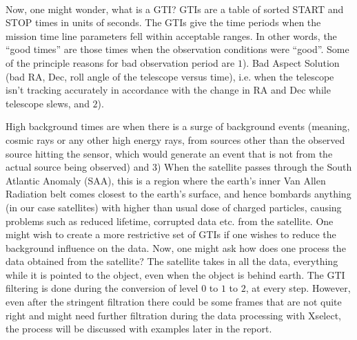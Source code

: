 \documentclass[a4paper,twoside]{report}
\numberwithin{equation}{section}
\begin{document}
\paragraph{}
Now, one might wonder, what is a GTI? GTIs are a table of sorted START and STOP times in units of seconds. The GTIs give the time periods when the mission time line parameters fell within acceptable ranges. In other words, the “good times” are those times when the observation conditions were “good”. Some of the principle reasons for bad observation period are $1$). Bad Aspect Solution (bad RA, Dec, roll angle of the telescope versus time), i.e. when the telescope isn’t tracking accurately in accordance with the change in RA and Dec while telescope slews, and $2$). 

High background times are when there is a surge of background events (meaning, cosmic rays or any other high energy rays, from sources other than the observed source hitting the sensor, which would generate an event that is not from the actual source being observed) and $3$) When the satellite passes through the South Atlantic Anomaly (SAA), this is a region where the earth's inner Van Allen Radiation belt comes closest to the earth's surface, and hence bombards anything (in our case satellites) with higher than usual dose of charged particles, causing problems such as reduced lifetime, corrupted data etc. from the satellite. One might wish to create a more restrictive set of GTIs if one wishes to reduce the background influence on the data. Now, one might ask how does one process the data obtained from the satellite? The satellite takes in all the data, everything while it is pointed to the object, even when the object is behind earth. The GTI filtering is done during the conversion of level $0$ to $1$ to $2$, at every step. However, even after the stringent filtration there could be some frames that are not quite right and might need further filtration during the data processing with Xselect, the process will be discussed with examples later in the report.
\end{document}
